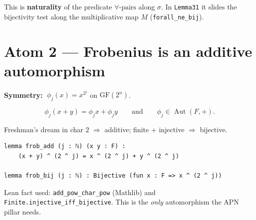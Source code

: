 \documentclass[11pt]{article}
\begin{document}
\begin{center}
\end{center}

\begin{coolfact}
This is \textbf{naturality} of the predicate $\forall\text{-pairs}$ along $\sigma$.
In \texttt{Lemma31} it slides the bijectivity test along the multiplicative
map $M$ (\texttt{forall\_ne\_bij}).
\end{coolfact}

\section{Atom 2 --- Frobenius is an additive automorphism}

\textbf{Symmetry:} $\;\phi_j(x)=x^{2^{j}}$ on $\mathrm{GF}(2^n)$.

\[
  \phi_j(x+y)=\phi_j x+\phi_j y
  \qquad\text{and}\qquad
  \phi_j\in\operatorname{Aut}(F,+).
\]

Freshman's dream in char $2$ $\Rightarrow$ additive; finite + injective
$\Rightarrow$ bijective.

\begin{lstlisting}
lemma frob_add (j : ℕ) (x y : F) :
    (x + y) ^ (2 ^ j) = x ^ (2 ^ j) + y ^ (2 ^ j)

lemma frob_bij (j : ℕ) : Bijective (fun x : F => x ^ (2 ^ j))
\end{lstlisting}

\begin{center}
\end{center}

\begin{remarkbox}
Lean fact used: \texttt{add\_pow\_char\_pow} (Mathlib) and
\texttt{Finite.injective\_iff\_bijective}. This is the \emph{only} automorphism
the APN pillar needs.
\end{remarkbox}
\end{document}
